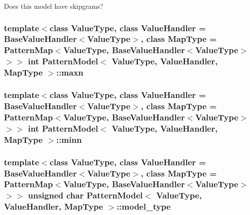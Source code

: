 Does this model have skipgrams? 

\hypertarget{classPatternModel_ac0e501edfcca21facfe0137ed5140c87}{}
\subsubsection[{maxn}]{\setlength{\rightskip}{0pt plus 5cm}template$<$class Value\+Type, class Value\+Handler = Base\+Value\+Handler$<$\+Value\+Type$>$, class Map\+Type = Pattern\+Map$<$\+Value\+Type, Base\+Value\+Handler$<$\+Value\+Type$>$$>$$>$ int {\bf Pattern\+Model}$<$ Value\+Type, Value\+Handler, Map\+Type $>$\+::maxn\hspace{0.3cm}{\ttfamily [protected]}}\label{classPatternModel_ac0e501edfcca21facfe0137ed5140c87}
\hypertarget{classPatternModel_abed492e59e656226b1c48b10c2904618}{}
\subsubsection[{minn}]{\setlength{\rightskip}{0pt plus 5cm}template$<$class Value\+Type, class Value\+Handler = Base\+Value\+Handler$<$\+Value\+Type$>$, class Map\+Type = Pattern\+Map$<$\+Value\+Type, Base\+Value\+Handler$<$\+Value\+Type$>$$>$$>$ int {\bf Pattern\+Model}$<$ Value\+Type, Value\+Handler, Map\+Type $>$\+::minn\hspace{0.3cm}{\ttfamily [protected]}}\label{classPatternModel_abed492e59e656226b1c48b10c2904618}
\hypertarget{classPatternModel_af28152ff3d5060e48c18423b8629d1eb}{}
\subsubsection[{model\+\_\+type}]{\setlength{\rightskip}{0pt plus 5cm}template$<$class Value\+Type, class Value\+Handler = Base\+Value\+Handler$<$\+Value\+Type$>$, class Map\+Type = Pattern\+Map$<$\+Value\+Type, Base\+Value\+Handler$<$\+Value\+Type$>$$>$$>$ unsigned char {\bf Pattern\+Model}$<$ Value\+Type, Value\+Handler, Map\+Type $>$\+::model\+\_\+type\hspace{0.3cm}{\ttfamily [protected]}}\label{classPatternModel_af28152ff3d5060e48c18423b8629d1eb}
\hypertarget{classPatternModel_a032f1517ae658e81fa2ca3360aba62a2}{}
